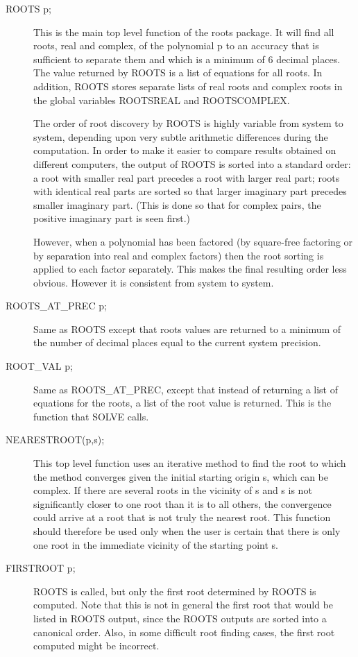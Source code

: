 \begin{description}
\item[ROOTS p;] This is the main top level function of the roots package.
It will find all roots, real and complex, of the polynomial p to an
accuracy that is sufficient to separate them and which is a minimum of 6
decimal places.  The value returned by ROOTS is a
list of equations for all roots.  In addition, ROOTS stores separate lists
of real roots and complex roots in the global variables ROOTSREAL and
ROOTSCOMPLEX.  

The order of root discovery by ROOTS is highly variable from system to
system, depending upon very subtle arithmetic differences during the
computation.  In order to make it easier to compare results obtained on
different computers, the output of ROOTS is sorted into a standard order:
a root with smaller real part precedes a root with larger real part; roots
with identical real parts are sorted so that larger imaginary part
precedes smaller imaginary part. (This is done so that for complex pairs,
the positive imaginary part is seen first.)

However, when a polynomial has been factored (by square-free factoring or
by separation into real and complex factors) then the root sorting is
applied to each factor separately.  This makes the final resulting order
less obvious.  However it is consistent from system to system.

\item[ROOTS\_AT\_PREC p;] Same as ROOTS except that roots values are
returned to a minimum of the number of decimal places equal to the current
system precision.

\item[ROOT\_VAL p;] Same as ROOTS\_AT\_PREC, except that instead of
returning a list of equations for the roots, a list of the root value is
returned.  This is the function that SOLVE calls.

\item[NEARESTROOT(p,s);] This top level function uses an iterative method
to find the root to which the method converges given the initial starting
origin s, which can be complex.  If there are several roots in the
vicinity of s and s is not significantly closer to one root than it is to
all others, the convergence could arrive at a root that is not truly the
nearest root.  This function should therefore be used only when the user
is certain that there is only one root in the immediate vicinity of the
starting point s.

\item[FIRSTROOT p;] ROOTS is called, but only the first root determined by
ROOTS is computed.  Note that this is not in general the first root that
would be listed in ROOTS output, since the ROOTS outputs are sorted into
a canonical order.  Also, in some difficult root finding cases, the first
root computed might be incorrect.
\end{description}


